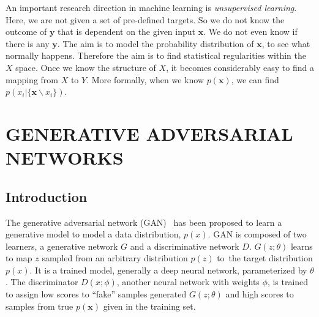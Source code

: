 \documentclass[a4paper,onesided,12pt]{report}
\begin{document}
An important research direction in machine learning is \emph{unsupervised learning}. Here, we are not given a set of pre-defined targets. So we do not know the outcome of $\boldsymbol{y}$ that is dependent on the given input $\boldsymbol{x}$. We do not even know if there is any $\boldsymbol{y}$. The aim is to model the probability distribution of $\boldsymbol{x}$, to see what normally happens. Therefore the aim is to find statistical regularities within the $X$ space. Once we know the structure of $X$, it becomes considerably easy to find a mapping from $X$ to $Y$. More formally, when we know $p(\boldsymbol{x})$, we can find $p(x_i | \{\boldsymbol{x} \backslash x_i\})$.





\chapter{GENERATIVE ADVERSARIAL NETWORKS}
\label{chapter:gan}

\section{Introduction}
\label{sec:gan:intro}

The generative adversarial network (GAN) \cite{gan}~has been proposed to learn a generative model to model a data distribution, $p(x)$. GAN is composed of two learners, a generative network $G$ and a discriminative network $D$. $G(z;\theta)$ learns to map $z$ sampled from an arbitrary distribution $p(z)$ to~the target distribution $p(x)$. It is a trained model, generally a deep neural network, parameterized by $\theta$. The discriminator $D(x;\phi)$, another neural network with weights $\phi$, is trained to assign low scores to ``fake'' samples generated $G(z;\theta)$ and high scores to samples from true $p(\boldsymbol{x})$ given in the training set.
\end{document}
